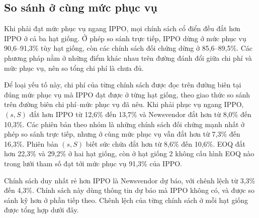 \subsection{So sánh ở cùng mức phục vụ}
\label{subsec:isoService}

Khi phải đạt mức phục vụ ngang IPPO, mọi chính sách cổ điển đều đắt hơn IPPO ở cả ba hạt giống. Ở phép so sánh trực tiếp, IPPO dừng ở mức phục vụ 90,6--91,3\% tùy hạt giống, còn các chính sách đối chứng dừng ở 85,6--89,5\%. Các phương pháp nằm ở những điểm khác nhau trên đường đánh đổi giữa chi phí và mức phục vụ, nên so tổng chi phí là chưa đủ.

Để loại yếu tố này, chi phí của từng chính sách được đọc trên đường biên tại đúng mức phục vụ mà IPPO đạt được ở từng hạt giống, theo giao thức so sánh trên đường biên chi phí--mức phục vụ đã nêu. Khi phải phục vụ ngang IPPO, $(s, S)$ đắt hơn IPPO từ 12,6\% đến 13,7\% và Newsvendor đắt hơn từ 8,0\% đến 10,3\%. Các phiên bản theo nhóm là những chính sách đối chứng mạnh nhất ở phép so sánh trực tiếp, nhưng ở cùng mức phục vụ vẫn đắt hơn từ 7,3\% đến 16,3\%. Phiên bản $(s, S)$ biết sức chứa đắt hơn từ 8,6\% đến 10,6\%. EOQ đắt hơn 22,3\% và 29,2\% ở hai hạt giống, còn ở hạt giống 2 không cấu hình EOQ nào trong lưới tham số đạt tới mức phục vụ 91,3\% của IPPO.

Chính sách duy nhất rẻ hơn IPPO là Newsvendor dự báo, với chênh lệch từ 3,3\% đến 4,3\%. Chính sách này dùng thông tin dự báo mà IPPO không có, và được so sánh kỹ hơn ở phần tiếp theo. Chênh lệch của từng chính sách ở mỗi hạt giống được tổng hợp dưới đây.

